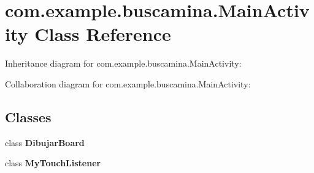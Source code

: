 \section{com.\-example.\-buscamina.\-Main\-Activity Class Reference}
\label{classcom_1_1example_1_1buscamina_1_1_main_activity}


Inheritance diagram for com.\-example.\-buscamina.\-Main\-Activity\-:


Collaboration diagram for com.\-example.\-buscamina.\-Main\-Activity\-:
\subsection*{Classes}
\begin{DoxyCompactItemize}
\item 
class {\bfseries Dibujar\-Board}
\item 
class {\bfseries My\-Touch\-Listener}
\end{DoxyCompactItemize}
